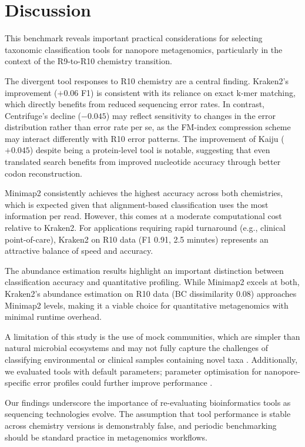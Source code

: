 \documentclass[11pt]{article}
\begin{document}
\section{Discussion}

This benchmark reveals important practical considerations for selecting taxonomic classification tools for nanopore metagenomics, particularly in the context of the R9-to-R10 chemistry transition.

The divergent tool responses to R10 chemistry are a central finding. Kraken2's improvement ($+0.06$ F1) is consistent with its reliance on exact k-mer matching, which directly benefits from reduced sequencing error rates. In contrast, Centrifuge's decline ($-0.045$) may reflect sensitivity to changes in the error distribution rather than error rate per se, as the FM-index compression scheme may interact differently with R10 error patterns. The improvement of Kaiju ($+0.045$) despite being a protein-level tool is notable, suggesting that even translated search benefits from improved nucleotide accuracy through better codon reconstruction.

Minimap2 consistently achieves the highest accuracy across both chemistries, which is expected given that alignment-based classification uses the most information per read. However, this comes at a moderate computational cost relative to Kraken2. For applications requiring rapid turnaround (e.g., clinical point-of-care), Kraken2 on R10 data (F1 0.91, 2.5 minutes) represents an attractive balance of speed and accuracy.

The abundance estimation results highlight an important distinction between classification accuracy and quantitative profiling. While Minimap2 excels at both, Kraken2's abundance estimation on R10 data (BC dissimilarity 0.08) approaches Minimap2 levels, making it a viable choice for quantitative metagenomics with minimal runtime overhead.

A limitation of this study is the use of mock communities, which are simpler than natural microbial ecosystems and may not fully capture the challenges of classifying environmental or clinical samples containing novel taxa \citep{sczyrba2017}. Additionally, we evaluated tools with default parameters; parameter optimisation for nanopore-specific error profiles could further improve performance \citep{wick2019}.

Our findings underscore the importance of re-evaluating bioinformatics tools as sequencing technologies evolve. The assumption that tool performance is stable across chemistry versions is demonstrably false, and periodic benchmarking should be standard practice in metagenomics workflows.
\end{document}
